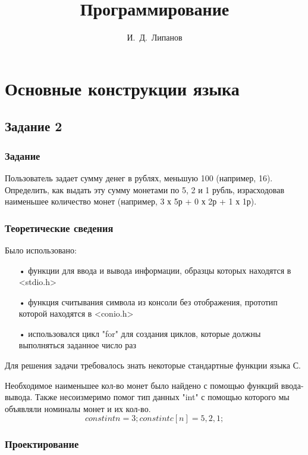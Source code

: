 \documentclass[12pt,a4paper]{report}
\author{И.~Д.~Липанов}
\title{Программирование}
\begin{document}
\maketitle
\tableofcontents{}
\chapter{Основные конструкции языка}
\section{Задание 2}
\subsection{Задание}
Пользователь задает сумму денег в рублях, меньшую 100 (например, 16). Определить, как выдать эту сумму монетами по 5, 2 и 1 рубль, израсходовав наименьшее количество монет (например, 3 х 5р + 0 х 2р + 1 х 1р).

\subsection{Теоретические сведения}

Было использовано:
\begin{enumerate}
\item[•] функции для ввода и вывода информации, образцы которых находятся в <stdio.h>
\item[•] функция считывания символа из консоли без отображения, прототип которой находятся в <conio.h>
\item[•] использовался цикл "for" для создания циклов, которые должны выполняться заданное число раз
\end{enumerate}

Для решения задачи требовалось знать некоторые стандартные функции языка С.

Необходимое наименьшее кол-во монет было найдено с помощью функций ввода-вывода. Также несоизмеримо помог тип данных "int" с помощью которого мы объявляли номиналы монет и их кол-во.
\begin{equation}
const int n=3;
const int c[n]={5,2,1};
\end{equation}


\subsection{Проектирование}
\end{document}
